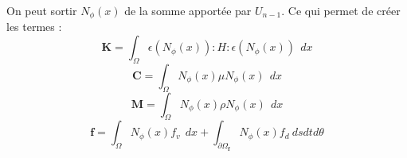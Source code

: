 On peut sortir $N_\phi(x)$ de la somme apportée par $U_{n-1}$. Ce qui permet de créer les termes :
\begin{equation}
\mathbf{K} = \int_\Omega \epsilon (N_\phi(x)) : H : \epsilon (N_\phi(x))~~dx
\end{equation}
\begin{equation}
\mathbf{C} = \int_\Omega N_\phi(x) \mu  N_\phi(x)~~dx
\end{equation}
\begin{equation}
\mathbf{M} = \int_\Omega N_\phi(x) \rho  N_\phi(x)~~dx
\end{equation}
\begin{equation}
\mathbf{f} = \int_\Omega N_\phi(x) f_v ~~dx 
	+ \int_{\partial \Omega_\mathbf{f}} N_\phi(x) f_d ~ds dt d\theta
\end{equation}


